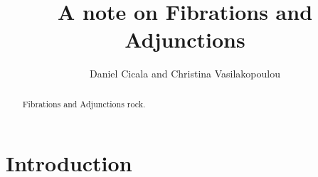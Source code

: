 \documentclass{amsart}
\begin{document}
\title{A note on Fibrations and Adjunctions}

\author{Daniel Cicala and Christina Vasilakopoulou} 
\address{Departement of Mathematics, University of California, Riverside, 900 University Avenue, 92521, USA}

\begin{abstract}
Fibrations and Adjunctions rock.
\end{abstract}

\maketitle

\tableofcontents


\section{Introduction}
\end{document}

